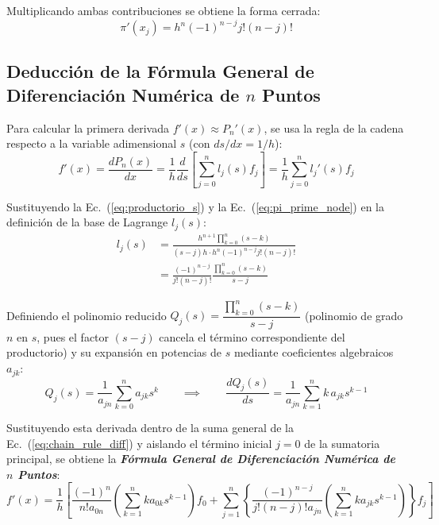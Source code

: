\documentclass[11pt, a4paper]{article}
\begin{document}
Multiplicando ambas contribuciones se obtiene la forma cerrada:
\begin{equation}
	\pi'(x_j) = h^n (-1)^{n-j} j! (n-j)!
	\label{eq:pi_prime_node}
\end{equation}

\subsection{Deducción de la Fórmula General de Diferenciación Numérica de $n$ Puntos}

Para calcular la primera derivada $f'(x) \approx P_n'(x)$, se usa la regla de la cadena respecto a la variable adimensional $s$ (con $ds/dx = 1/h$):
\begin{equation}
	f'(x) = \frac{d P_n(x)}{dx} = \frac{1}{h} \frac{d}{ds} \left[ \sum_{j=0}^{n} l_j(s) f_j \right] = \frac{1}{h} \sum_{j=0}^{n} l_j'(s) f_j
	\label{eq:chain_rule_diff}
\end{equation}

Sustituyendo la Ec.~(\ref{eq:productorio_s}) y la Ec.~(\ref{eq:pi_prime_node}) en la definición de la base de Lagrange $l_j(s)$:
\begin{align}
	l_j(s) &= \frac{h^{n+1} \prod_{k=0}^{n} (s - k)}{(s - j)h \cdot h^n (-1)^{n-j} j! (n-j)!} \nonumber \\
	&= \frac{(-1)^{n-j}}{j! (n-j)!} \frac{\prod_{k=0}^{n} (s - k)}{s - j}
\end{align}

Definiendo el polinomio reducido $Q_j(s) = \dfrac{\prod_{k=0}^{n} (s-k)}{s-j}$ (polinomio de grado $n$ en $s$, pues el factor $(s-j)$ cancela el término correspondiente del productorio) y su expansión en potencias de $s$ mediante coeficientes algebraicos $a_{jk}$:
\begin{equation}
	Q_j(s) = \frac{1}{a_{jn}} \sum_{k=0}^{n} a_{jk} s^k
	\qquad \implies \qquad
	\frac{d Q_j(s)}{ds} = \frac{1}{a_{jn}} \sum_{k=1}^{n} k\, a_{jk} s^{k-1}
\end{equation}

Sustituyendo esta derivada dentro de la suma general de la Ec.~(\ref{eq:chain_rule_diff}) y aislando el término inicial $j=0$ de la sumatoria principal, se obtiene la \textbf{\textit{Fórmula General de Diferenciación Numérica de $n$ Puntos}}:
\begin{equation}
	f'(x) = \frac{1}{h} \left[ \frac{(-1)^{n}}{n! a_{0n}} \left( \sum_{k=1}^{n} k a_{0k} s^{k-1} \right) f_0 + \sum_{j=1}^{n} \left\{ \frac{(-1)^{n-j}}{j!(n-j)! a_{jn}} \left( \sum_{k=1}^{n} k a_{jk} s^{k-1} \right) \right\} f_j \right]
	\label{eq:general_num_diff}
\end{equation}
\end{document}
